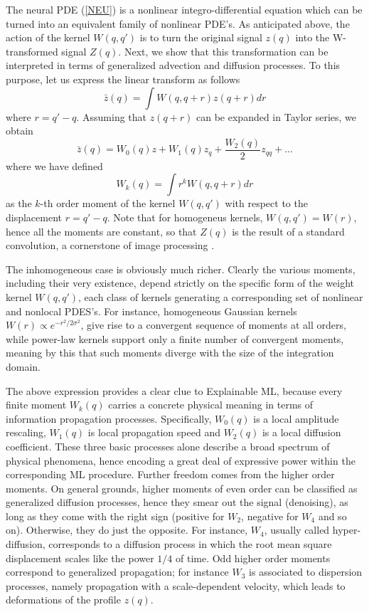\documentclass[15pt]{article}
\begin{document}
The neural PDE (\ref{NEU}) is a nonlinear integro-differential equation 
which can be turned into an equivalent family of nonlinear PDE's. 
As anticipated above, the action of the kernel $W(q,q')$ is to turn
the original signal $z(q)$ into the W-transformed signal $Z(q)$.
Next, we show that this transformation can be interpreted in terms 
of generalized advection and diffusion processes.
To this purpose, let us express the linear transform as follows
\begin{equation}
\bar z (q) = \int W(q,q+r) z(q+r) dr 
\end{equation}
where $r=q'-q$.
Assuming that $z(q+r)$ can be expanded in Taylor series, we obtain
\begin{equation}
\bar z(q) = W_0(q) z + W_1(q) z_q + \frac{W_2(q)}{2} z_{qq} + \dots  
\end{equation}
where we have defined 
\begin{equation}
\label{MOME}
W_k(q) = \int r^k W(q,q+r) dr 
\end{equation}
as the $k$-th order moment of the kernel $W(q,q')$ with respect to the displacement $r=q'-q$.
Note that for homogeneus kernels, $W(q,q')=W(r)$, hence all the moments are 
constant, so that $Z(q)$ is the result of a standard convolution, a cornerstone
of image processing \cite{CNN}. 

The inhomogeneous case is obviously much richer.
Clearly the various moments, including their very existence, depend strictly
on the specific form of the weight kernel $W(q,q')$, each class of kernels generating a corresponding
set of nonlinear and nonlocal PDES's.
For instance, homogeneous Gaussian kernels $W(r) \propto e^{-r^2/2 \sigma^2}$, give 
rise to a convergent sequence of moments at all orders, while power-law kernels
support only a finite number of convergent moments, meaning by this 
that such moments diverge with the size of the integration domain.   

The above expression provides a clear clue to Explainable ML, because 
every finite moment $W_k(q)$ carries a concrete physical meaning in 
terms of information propagation processes.
Specifically, $W_0(q)$ is a local amplitude rescaling, $W_1(q)$ is 
local propagation speed and $W_2(q)$ is a local diffusion coefficient.
These three basic processes alone describe a broad spectrum of physical 
phenomena, hence encoding a great deal of expressive power within the
corresponding ML procedure.
Further freedom comes from the higher order moments.
On general grounds, higher moments of even order can be classified as 
generalized diffusion processes, hence they smear out the signal (denoising),
as long as they come with the right sign (positive for $W_2$, negative for $W_4$ and so on). 
Otherwise, they do just the opposite.
For instance, $W_4$, usually called hyper-diffusion, corresponds to a diffusion process
in which the root mean square displacement scales like the power $1/4$ of time.  
Odd higher order moments correspond to generalized propagation; for instance 
$W_3$ is  associated to dispersion processes, namely propagation with a scale-dependent 
velocity, which leads to deformations of the profile $z(q)$. 
\end{document}
